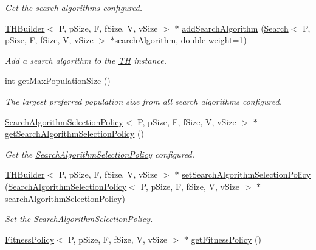 \begin{DoxyCompactItemize}
\begin{DoxyCompactList}\small\item\em Get the search algorithms configured. \end{DoxyCompactList}\item 
\hyperlink{classTHBuilder}{T\+H\+Builder}$<$ P, p\+Size, F, f\+Size, V, v\+Size $>$ $\ast$ \hyperlink{classTHBuilder_a53f501609ac8f791e02668406cbf81a3}{add\+Search\+Algorithm} (\hyperlink{classSearch}{Search}$<$ P, p\+Size, F, f\+Size, V, v\+Size $>$ $\ast$search\+Algorithm, double weight=1)
\begin{DoxyCompactList}\small\item\em Add a search algorithm to the \hyperlink{classTH}{TH} instance. \end{DoxyCompactList}\item 
int \hyperlink{classTHBuilder_a876380ef9e0647b90bd80bcc04cbcd58}{get\+Max\+Population\+Size} ()
\begin{DoxyCompactList}\small\item\em The largest \textquotesingle{}preferred population size\textquotesingle{} from all search algorithms configured. \end{DoxyCompactList}\item 
\hyperlink{classSearchAlgorithmSelectionPolicy}{Search\+Algorithm\+Selection\+Policy}$<$ P, p\+Size, F, f\+Size, V, v\+Size $>$ $\ast$ \hyperlink{classTHBuilder_a097e1501549341f26e5316aca8108b5c}{get\+Search\+Algorithm\+Selection\+Policy} ()
\begin{DoxyCompactList}\small\item\em Get the \hyperlink{classSearchAlgorithmSelectionPolicy}{Search\+Algorithm\+Selection\+Policy} configured. \end{DoxyCompactList}\item 
\hyperlink{classTHBuilder}{T\+H\+Builder}$<$ P, p\+Size, F, f\+Size, V, v\+Size $>$ $\ast$ \hyperlink{classTHBuilder_ac69c37de4054ba5357697671f2c744e9}{set\+Search\+Algorithm\+Selection\+Policy} (\hyperlink{classSearchAlgorithmSelectionPolicy}{Search\+Algorithm\+Selection\+Policy}$<$ P, p\+Size, F, f\+Size, V, v\+Size $>$ $\ast$search\+Algorithm\+Selection\+Policy)
\begin{DoxyCompactList}\small\item\em Set the \hyperlink{classSearchAlgorithmSelectionPolicy}{Search\+Algorithm\+Selection\+Policy}. \end{DoxyCompactList}\item 
\hyperlink{classFitnessPolicy}{Fitness\+Policy}$<$ P, p\+Size, F, f\+Size, V, v\+Size $>$ $\ast$ \hyperlink{classTHBuilder_a17045426d43ae6798b10b552e6743f6d}{get\+Fitness\+Policy} ()

\end{DoxyCompactItemize}
